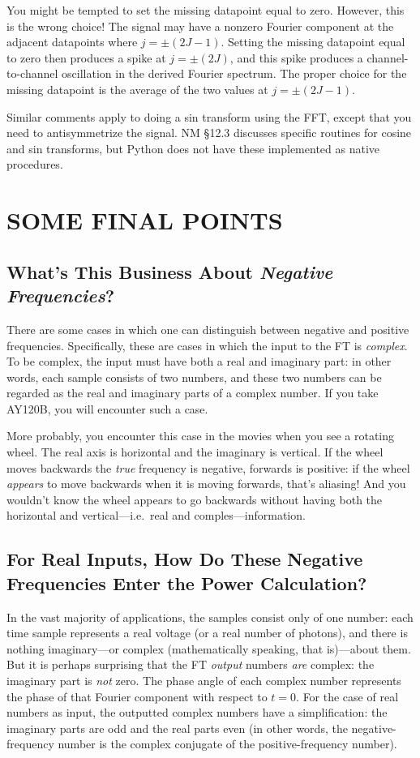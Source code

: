 \documentclass[preprint]{aastex}
\begin{document}
	You might be tempted to set the missing datapoint equal to
zero. However, this is the wrong choice! The signal may have a nonzero
Fourier component at the adjacent datapoints where $j = \pm (2J-1)$.
Setting the missing datapoint equal to zero then produces a spike at $j =
\pm (2J)$, and this spike produces a channel-to-channel oscillation in
the derived Fourier spectrum. The proper choice for the missing datapoint
is the average of the two values at $j = \pm (2J-1)$.

	Similar comments apply to doing a sin transform using the FFT,
except that you need to antisymmetrize the signal. NM \S 12.3 discusses
specific routines for cosine and sin transforms, but Python does not have
these implemented as native procedures.

\section{SOME FINAL POINTS}

\subsection{What's This Business About {\it Negative Frequencies}?}

          There are some cases in which one can distinguish between
negative and positive frequencies. Specifically, these are cases in
which the input to the FT is {\it complex}. To be complex, the input
must have both a real and imaginary part: in other words, each sample
consists of two numbers, and these two numbers can be regarded as the
real and imaginary parts of a complex number. If you take AY120B, you
will encounter such a case. 

	More probably, you encounter this case in the movies when you
see a rotating wheel. The real axis is horizontal and the imaginary is
vertical. If the wheel moves backwards the {\it true} frequency is
negative, forwards is positive: if the wheel {\it appears} to move
backwards when it is moving forwards, that's aliasing! And you wouldn't
know the wheel appears to go backwards without having both the
horizontal and vertical---i.e.\ real and comples---information.

\subsection{For Real Inputs, How Do These Negative Frequencies Enter the
Power Calculation?}

          In the vast majority of applications, the samples consist
only of one number: each time sample represents
a real voltage (or a real number of photons), and there is nothing
imaginary---or complex (mathematically speaking, that is)---about them. 
But it is perhaps surprising that the FT {\it output} numbers {\it are}
complex: the imaginary part is {\it not} zero.  The phase angle of each
complex number represents the phase of that Fourier component with
respect to $t=0$.  For the case of real numbers as input, the outputted
complex numbers have a simplification: the imaginary parts are odd and
the real parts even (in other words, the negative-frequency number is
the complex conjugate of the positive-frequency number). 
\end{document}
